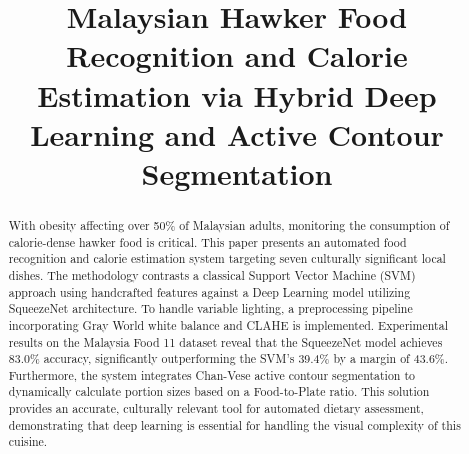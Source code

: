 \documentclass[conference, a4paper]{IEEEtran}
\begin{document}
\title{Malaysian Hawker Food Recognition and Calorie Estimation via Hybrid Deep Learning and Active Contour Segmentation}

\author{
\and
{}
\and
{}
\and
{}
}

\maketitle

\begin{abstract}
With obesity affecting over 50\% of Malaysian adults, monitoring the consumption of calorie-dense hawker food is critical. This paper presents an automated food recognition and calorie estimation system targeting seven culturally significant local dishes. The methodology contrasts a classical Support Vector Machine (SVM) approach using handcrafted features against a Deep Learning model utilizing SqueezeNet architecture. To handle variable lighting, a preprocessing pipeline incorporating Gray World white balance and CLAHE is implemented. Experimental results on the Malaysia Food 11 dataset reveal that the SqueezeNet model achieves 83.0\% accuracy, significantly outperforming the SVM's 39.4\% by a margin of 43.6\%. Furthermore, the system integrates Chan-Vese active contour segmentation to dynamically calculate portion sizes based on a Food-to-Plate ratio. This solution provides an accurate, culturally relevant tool for automated dietary assessment, demonstrating that deep learning is essential for handling the visual complexity of this cuisine.
\end{abstract}
\end{document}
